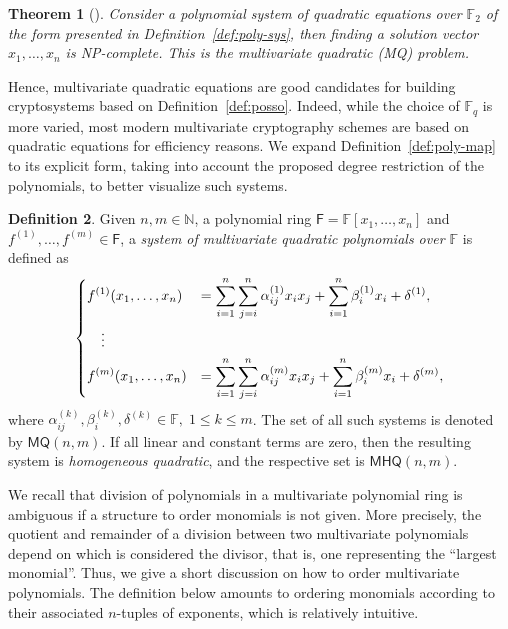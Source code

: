 \documentclass[english]{ufsc-thesis-rn46-2019/ufsc-thesis-rn46-2019}
\newtheorem{theorem}{Theorem}[section]
\theoremstyle{definition}
\newtheorem{definition}[theorem]{Definition}
\begin{document}
\begin{theorem}[{\cite[App.~A]{Patarin:199711}}]
  Consider a polynomial system of \emph{quadratic equations over
  $\mathbb{F}_{2}$} of the form presented in Definition~\ref{def:poly-sys},
  then finding a solution vector $x_{1}, \dots, x_{n}$ is NP-complete. This is
  the \emph{multivariate quadratic (MQ) problem}.
\end{theorem}

Hence, multivariate quadratic equations are good candidates for building
cryptosystems based on Definition~\ref{def:posso}. Indeed, while the choice of
$\mathbb{F}_{q}$ is more varied, most modern multivariate cryptography schemes
are based on quadratic equations for efficiency reasons. We expand
Definition~\ref{def:poly-map} to its explicit form, taking into account the
proposed degree restriction of the polynomials, to better visualize such
systems.

\begin{definition}\label{def:quad-poly-sys}
  Given $n, m \in \mathbb{N}$, a polynomial ring
  $\mathsf{F} = \mathbb{F}[x_{1}, \dots, x_{n}]$ and
  $f^{(1)}, \dots, f^{(m)} \in \mathsf{F}$, a \emph{system of multivariate
  quadratic polynomials over $\mathbb{F}$} is defined as
  \begin{align}
    \begin{split}
      \begin{dcases}
        f^{(1)}(x_{1}, \dots, x_{n})
          &= \sum_{i = 1}^{n} \sum_{j = i}^{n} \alpha_{ij}^{(1)} x_{i} x_{j}
            + \sum_{i = 1}^{n} \beta_{i}^{(1)} x_{i} + \delta^{(1)}, \\
        \quad \vdots \\
        f^{(m)}(x_{1}, \dots, x_{n})
          &= \sum_{i = 1}^{n} \sum_{j = i}^{n} \alpha_{ij}^{(m)} x_{i} x_{j}
            + \sum_{i = 1}^{n} \beta_{i}^{(m)} x_{i} + \delta^{(m)},
      \end{dcases}
    \end{split}
  \end{align}
  where
  $\alpha_{ij}^{(k)}, \beta_{i}^{(k)}, \delta^{(k)} \in \mathbb{F},\;
    1 \leq k \leq m$.
  The set of all such systems is denoted by $\mathsf{MQ}(n, m)$. If all linear
  and constant terms are zero, then the resulting system is
  \emph{homogeneous quadratic}, and the respective set is $\mathsf{MHQ}(n, m)$.
\end{definition}

We recall that division of polynomials in a multivariate polynomial ring is
ambiguous if a structure to order monomials is not given. More precisely, the
quotient and remainder of a division between two multivariate polynomials
depend on which is considered the divisor, that is, one representing the
``largest monomial''. Thus, we give a short discussion on how to order
multivariate polynomials. The definition below amounts to ordering monomials
according to their associated $n$-tuples of exponents, which is relatively
intuitive.
\end{document}
